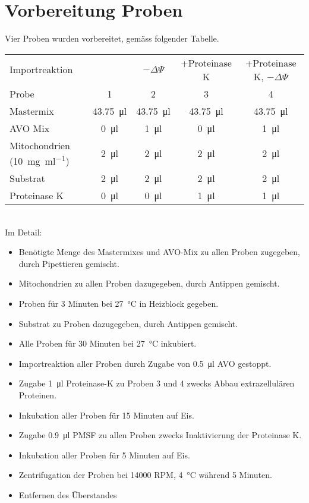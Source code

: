 \documentclass[a4paper,german]{scrreprt}
\begin{document}
\section{Vorbereitung Proben}

Vier Proben wurden vorbereitet, gemäss folgender Tabelle.
\\

\begin{tabu}{lcccc}
	\toprule
	Importreaktion & & $-\Delta\Psi$ & +Proteinase K & +Proteinase K, $-\Delta\Psi$ \\
	Probe & 1 & 2 & 3 & 4 \\
	\midrule
	Mastermix & \SI{43.75}{\ul} & \SI{43.75}{\ul} & \SI{43.75}{\ul} & \SI{43.75}{\ul} \\
	AVO Mix & \SI{0}{\ul} & \SI{1}{\ul} &\SI{0}{\ul} & \SI{1}{\ul} \\
	Mitochondrien (\SI{10}{\mg \per \ml}) & \SI{2}{\ul} & \SI{2}{\ul} &\SI{2}{\ul} & \SI{2}{\ul} \\
	Substrat & \SI{2}{\ul} & \SI{2}{\ul} &\SI{2}{\ul} & \SI{2}{\ul} \\
	Proteinase K & \SI{0}{\ul} & \SI{0}{\ul} &\SI{1}{\ul} & \SI{1}{\ul} \\
	\bottomrule
\end{tabu}
\\

Im Detail:
\begin{itemize}
	\item Benötigte Menge des Mastermixes und AVO-Mix zu allen Proben zugegeben, durch Pipettieren gemischt.
	\item Mitochondrien zu allen Proben dazugegeben, durch Antippen gemischt.
	\item Proben für 3 Minuten bei \SI{27}{\celsius} in Heizblock gegeben.
	\item Substrat zu Proben dazugegeben, durch Antippen gemischt.
	\item Alle Proben für 30 Minuten bei \SI{27}{\celsius} inkubiert.
	\item Importreaktion aller Proben durch Zugabe von \SI{0.5}{\ul} AVO gestoppt.
	\item Zugabe \SI{1}{\ul} Proteinase-K zu Proben 3 und 4 zwecks Abbau
		extrazellulären Proteinen.
	\item Inkubation aller Proben für 15 Minuten auf Eis.
	\item Zugabe \SI{0.9}{\ul} PMSF zu allen Proben zwecks Inaktivierung der Proteinase K.
	\item Inkubation aller Proben für 5 Minuten auf Eis.
	\item Zentrifugation der Proben bei 14000 RPM, \SI{4}{\celsius} während 5 Minuten.
	\item Entfernen des Überstandes
\end{itemize}
\end{document}
